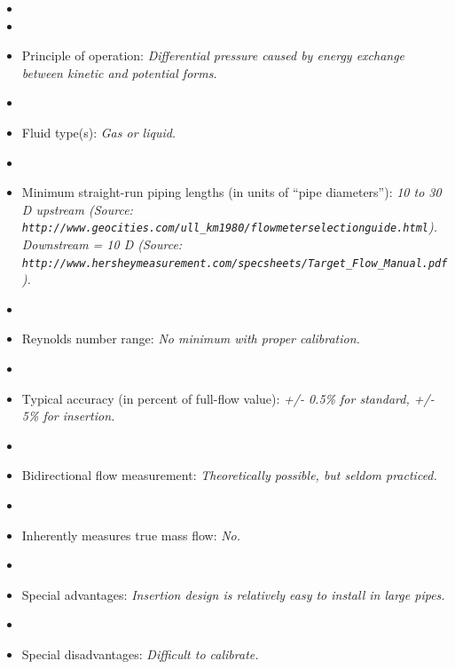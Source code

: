 \documentclass[12pt,a4paper]{article}
\begin{document}
\begin{itemize}
\goodbreak
\item{} 
\vskip 5pt
\item\item{} Principle of operation: {\it Differential pressure caused by energy exchange between kinetic and potential forms.}
\vskip 5pt
\item\item{} Fluid type(s): {\it Gas or liquid.}
\vskip 5pt
\item\item{} Minimum straight-run piping lengths (in units of ``pipe diameters''): {\it 10 to 30 D upstream (Source: {\tt http://www.geocities.com/ull\_km1980/flowmeterselectionguide.html}).  Downstream = 10 D (Source: {\tt http://www.hersheymeasurement.com/specsheets/Target\_Flow\_Manual.pdf}).}
\vskip 5pt
\item\item{} Reynolds number range: {\it No minimum with proper calibration.}
\vskip 5pt
\item\item{} Typical accuracy (in percent of full-flow value): {\it +/- 0.5\% for standard, +/- 5\% for insertion.}
\vskip 5pt
\item\item{} Bidirectional flow measurement: {\it Theoretically possible, but seldom practiced.}
\vskip 5pt
\item\item{} Inherently measures true mass flow: {\it No.}
\vskip 5pt
\item\item{} Special advantages: {\it Insertion design is relatively easy to install in large pipes.}
\vskip 5pt
\item\item{} Special disadvantages: {\it Difficult to calibrate.}
\end{itemize}
\end{document}
